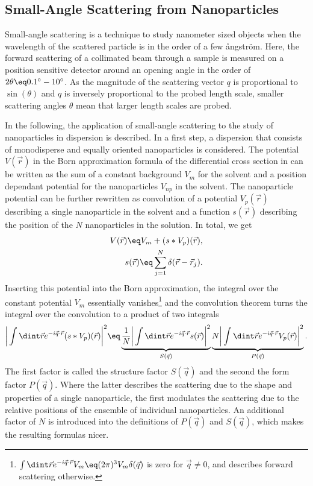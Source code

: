 \documentclass[\main/dresen_thesis.tex]{subfiles}
\begin{document}
\subsection{Small-Angle Scattering from Nanoparticles}\label{sec:theoreticalBackground:scattering:SASNanoparticles}
Small-angle scattering is a technique to study nanometer sized objects when the wavelength of the scattered particle is in the order of a few {\aa}ngstr\"om. 
Here, the forward scattering of a collimated beam through a sample is measured on a position sensitive detector around an opening angle in the order of $2 \theta \eq 0.1^\circ - 10^\circ$. 
As the magnitude of the scattering vector $q$ is proportional to $\sin(\theta)$ and $q$ is inversely proportional to the probed length scale, smaller scattering angles $\theta$ mean that larger length scales are probed. 

In the following, the application of small-angle scattering to the study of nanoparticles in dispersion is described. 
In a first step, a dispersion that consists of monodisperse and equally oriented nanoparticles is considered. 
The potential $V(\vec{r})$ in the Born approximation formula of the differential cross section in  can be written as the sum of a constant background $V_m$ for the solvent and a position dependant potential for the nanoparticles $V_{np}$ in the solvent. The nanoparticle potential can be further rewritten as convolution of a potential $V_{p}(\vec{r})$ describing a single nanoparticle in the solvent and a function $s(\vec{r})$ describing the position of the $N$ nanoparticles in the solution. In total, we get
\begin{align}
  V(\vec{r}) \eq V_{m} + (s * V_{p})(\vec{r}),\\
  s(\vec{r}) \eq \sum_{j=1}^N \delta(\vec{r} - \vec{r}_j).
\end{align}
Inserting this potential into the Born approximation, the integral over the constant potential $V_m$ essentially vanishes\footnote{
  $\int \dint \vec{r} e^{-i \vec{q} \cdot \vec{r}} V_m \eq (2\pi)^3 V_m \delta(\vec{q})$ is zero for $\vec{q} \neq 0$, and describes forward scattering otherwise.
} and the convolution theorem turns the integral over the convolution to a product of two integrals
\begin{align}
  \bigg| \int \dint \vec{r} e^{-i\vec{q} \cdot \vec{r}} (s * V_{p})(\vec{r}) \bigg|^2 
  \eq \underbrace{\frac{1}{N} \bigg|\int \dint \vec{r} e^{-i\vec{q} \cdot \vec{r}} s(\vec{r})\bigg|^2}_{S(\vec{q})}
  \underbrace{N \bigg|\int \dint \vec{r} e^{-i\vec{q} \cdot \vec{r}} V_{p}(\vec{r}) \bigg|^2}_{P(\vec{q})}.
\end{align}
The first factor is called the structure factor $S(\vec{q})$ and the second the form factor $P(\vec{q})$. 
Where the latter describes the scattering due to the shape and properties of a single nanoparticle, the first modulates the scattering due to the relative positions of the ensemble of individual nanoparticles. 
An additional factor of $N$ is introduced into the definitions of $P(\vec{q})$ and $S(\vec{q})$, which makes the resulting formulas nicer.
\end{document}

